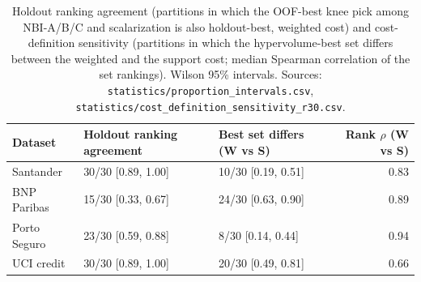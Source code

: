 \begin{table}[t]
\centering
\caption{Holdout ranking agreement (partitions in which the OOF-best knee pick among NBI-A/B/C and scalarization is also holdout-best, weighted cost) and cost-definition sensitivity (partitions in which the hypervolume-best set differs between the weighted and the support cost; median Spearman correlation of the set rankings). Wilson 95\% intervals. Sources: \texttt{statistics/proportion\_intervals.csv}, \texttt{statistics/cost\_definition\_sensitivity\_r30.csv}.}
\label{tab:holdout_cost}
\small
\begin{tabular}{l l l r}
\toprule
Dataset & Holdout ranking agreement & Best set differs (W vs S) & Rank $\rho$ (W vs S) \\
\midrule
Santander & 30/30 [0.89, 1.00] & 10/30 [0.19, 0.51] & 0.83 \\
BNP Paribas & 15/30 [0.33, 0.67] & 24/30 [0.63, 0.90] & 0.89 \\
Porto Seguro & 23/30 [0.59, 0.88] & 8/30 [0.14, 0.44] & 0.94 \\
UCI credit & 30/30 [0.89, 1.00] & 20/30 [0.49, 0.81] & 0.66 \\
\bottomrule
\end{tabular}
\end{table}
